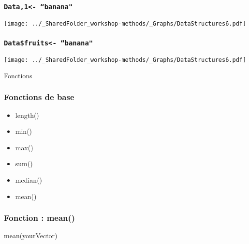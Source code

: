 \documentclass{beamer}
\begin{document}
    \begin{frame}
        \frametitle{\texttt{Data,1\rbrack  <- ``banana"}} \vspace{0.6cm}
        \begin{center}
            \texttt{[image: ../\_SharedFolder\_workshop-methods/\_Graphs/DataStructures6.pdf]}
        \end{center}
    \end{frame}
    
    \begin{frame}
        \frametitle{\texttt{Data\$fruits\rbrack <- ``banana"}} \vspace{0.6cm}
        \begin{center}
            \texttt{[image: ../\_SharedFolder\_workshop-methods/\_Graphs/DataStructures6.pdf]}
        \end{center}
    \end{frame}


\begin{frame}
     \begin{center}
          \Huge Fonctions
      \end{center}
    \end{frame}


    \begin{frame}
        \frametitle{Fonctions de base \R}
        \begin{itemize}
            \item length()
            \item min()
            \item max()
            \item sum()
            \item median()
            \item mean()
        \end{itemize}
    \end{frame}
        
    \begin{frame}[fragile=singleslide]
        \frametitle{Fonction \R : mean()}
        \begin{code}
mean(yourVector)
        \end{code}
    \end{frame}
    
\end{document}
